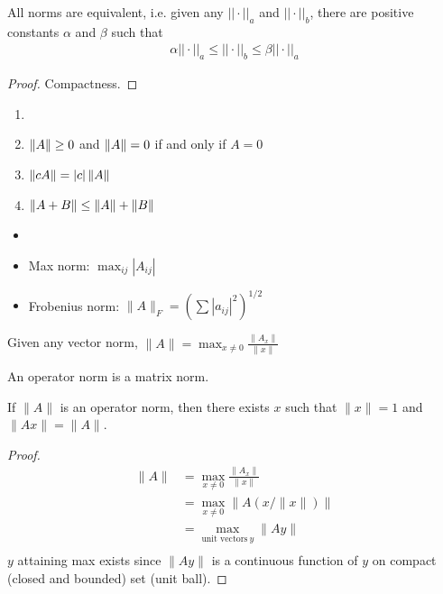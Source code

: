 \documentclass[11pt]{article}
\numberwithin{equation}{section}
\begin{document}
\begin{lemma}
    All norms are equivalent, i.e. given any $||\cdot||_a$ and $||\cdot||_b$, there are positive constants $\alpha$ and $\beta$ such that \begin{align*}
        \alpha ||\cdot||_a \leq ||\cdot||_b \leq \beta ||\cdot||_a
    \end{align*}
    \begin{proof}
        Compactness.
    \end{proof}
\end{lemma}

\begin{definition}
    \begin{enumerate}
        \item[]
        \item $\left\| A \right\| \geq 0$ and $\left\| A \right\|=0$ if and only if $A=0$
        \item $\left\| cA \right\| = |c|\left\| A \right\|$
        \item $\left\| A+B \right\| \leq \left\| A \right\| + \left\| B \right\|$
    \end{enumerate}
\end{definition}

\begin{example}
    \begin{itemize}
        \item[]
        \item Max norm: $\max_{ij} |A_{ij}|$
        \item Frobenius norm: $\|A\|_{F} = \left(\sum\left|a_{i j}\right|^{2}\right)^{1 / 2}$
    \end{itemize}
\end{example}

\begin{definition}
    Given any vector norm, $\|A\|=\max _{x \neq 0} \frac{\| A_{x} \|}{\|x\|}$
\end{definition}

\begin{lemma}
    An operator norm is a matrix norm.
\end{lemma}

\begin{lemma}
    If $\|A\|$ is an operator norm, then there exists $x$ such that $\|x\|=1$ and $\|Ax\|=\|A\|$.
    \begin{proof}
        \begin{align*}
            \|A\| &= \max _{x \neq 0} \frac{\| A_{x} \|}{\|x\|} \\
            &= \max _{x \neq 0} \| A (x/\|x\|) \| \\
            &= \max _{\text{unit\ vectors}\ y} \| A y \| \\
        \end{align*}
        $y$ attaining max exists since $\|Ay\|$ is a continuous function of $y$ on compact (closed and bounded) set (unit ball).
    \end{proof}
\end{lemma}
\end{document}
